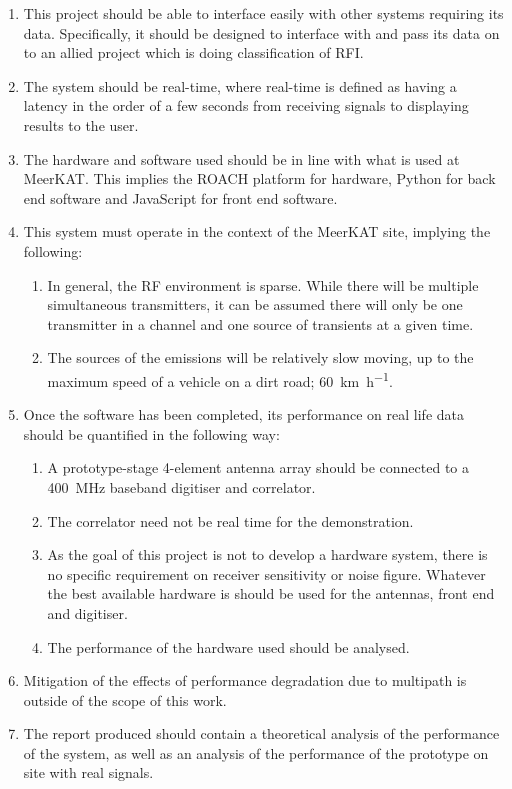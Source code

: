 \begin{enumerate}
  \item This project should be able to interface easily with other systems requiring its data. Specifically, it should be designed to interface with and pass its data on to an allied project which is doing classification of RFI.
  \item The system should be real-time, where real-time is defined as having a latency in the order of a few seconds from receiving signals to displaying results to the user. 
  \item The hardware and software used should be in line with what is used at MeerKAT. This implies the ROACH platform for hardware, Python for back end software and JavaScript for front end software.  
  \item This system must operate in the context of the MeerKAT site, implying the following:
  \begin{enumerate}
      \item In general, the RF environment is sparse. While there will be multiple simultaneous transmitters, it can be assumed there will only be one transmitter in a channel and one source of transients at a given time.
      \item The sources of the emissions will be relatively slow moving, up to the maximum speed of a vehicle on a dirt road; \SI[per-mode=symbol]{60}{\kilo\metre\per\hour}.
  \end{enumerate}

  \item Once the software has been completed, its performance on real life data should be quantified in the following way:
    \begin{enumerate}
      \item A prototype-stage 4-element antenna array should be connected to a \SI{400}{\mega\hertz} baseband digitiser and correlator.
      \item The correlator need not be real time for the demonstration.
      \item As the goal of this project is not to develop a hardware system, there is no specific requirement on receiver sensitivity or noise figure. Whatever the best available hardware is should be used for the antennas, front end and digitiser. 
      \item The performance of the hardware used should be analysed. 
    \end{enumerate}
  \item Mitigation of the effects of performance degradation due to multipath is outside of the scope of this work.

  \item The report produced should contain a theoretical analysis of the performance of the system, as well as an analysis of the performance of the prototype on site with real signals. 
\end{enumerate}

